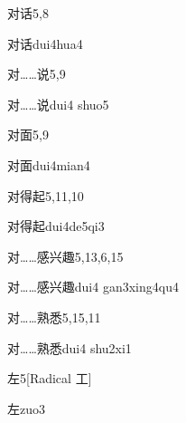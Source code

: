 \begin{entry}{对话}{5,8}
  \begin{phonetics}{对话}{dui4hua4}
  \end{phonetics}
\end{entry}

\begin{entry}{对……说}{5,9}
  \begin{phonetics}{对……说}{dui4 shuo5}
  \end{phonetics}
\end{entry}

\begin{entry}{对面}{5,9}
  \begin{phonetics}{对面}{dui4mian4}
  \end{phonetics}
\end{entry}

\begin{entry}{对得起}{5,11,10}
  \begin{phonetics}{对得起}{dui4de5qi3}
  \end{phonetics}
\end{entry}

\begin{entry}{对……感兴趣}{5,13,6,15}
  \begin{phonetics}{对……感兴趣}{dui4 gan3xing4qu4}
  \end{phonetics}
\end{entry}

\begin{entry}{对……熟悉}{5,15,11}
  \begin{phonetics}{对……熟悉}{dui4 shu2xi1}
  \end{phonetics}
\end{entry}

\begin{entry}{左}{5}[Radical 工]
  \begin{phonetics}{左}{zuo3}
  \end{phonetics}
\end{entry}

